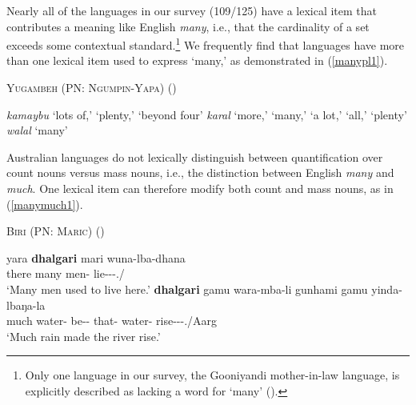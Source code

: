 \documentclass[12pt,egregdoesnotlikesansseriftitles]{scrartcl}
\newcommand{\ofy}{/125} %
\begin{document}
Nearly all of the languages in our survey (109\ofy) have a lexical item that contributes a meaning like English \textit{many}, i.e., that the cardinality of a set exceeds some contextual standard.\footnote{Only one language in our survey, the Gooniyandi mother-in-law language, is explicitly described as lacking a word for `many' (\citealt[636]{mcgregor89}).} We frequently find that languages  have more than one lexical item used to express `many,' as demonstrated in (\ref{manypl1}). %

\begin{exe}
  \ex  \textsc{Yugambeh (PN: Ngumpin-Yapa)} \hfill(\citealt{sharpe98}) \label{manypl1}
  \begin{xlist}
    \ex \textit{kamaybu} `lots of,' `plenty,' `beyond four'
    \ex \textit{karal} `more,' `many,' `a lot,' `all,' `plenty'
    \ex \textit{walal}  `many' 
  \end{xlist} 
\end{exe}

Australian languages do not lexically distinguish between quantification over count nouns versus mass nouns, i.e., the distinction between English \textit{many} and \textit{much}. One lexical item can therefore modify both count and mass nouns, as in (\ref{manymuch1}).

\begin{exe}
  \ex \textsc{Biri (PN: Maric}) \hfill(\cite[54]{terrill98}) \label{manymuch1}
  \begin{xlist} 
    \ex \gll  yara    \textbf{dhalgari} mari  wuna-lba-dhana \\
    there  many    men-\Abs{} lie-\Cont-\Pst-\Tpl.\Sarg/\Aarg\\
    \glt `Many men used to live here.'
    \ex \gll \textbf{dhalgari} gamu wara-mba-li gunhami gamu yinda-lbaŋa-la\\
    much  water-\Abs{} be-\Caus-\Pst{} that-\Abs{}  water-\Abs{}  rise-\Cont-\Prs-\Tsg.\Sarg/Aarg\\
    \glt `Much rain made the river rise.'
  \end{xlist}
\end{exe}
\end{document}
